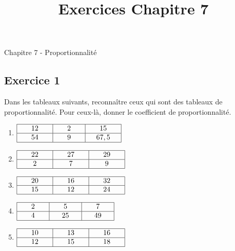 \documentclass[12 pt]{extarticle}
\title{Exercices Chapitre 7}
\date{}
\theoremstyle{plain}
\begin{document}
\begin{center}{\Large Chapitre 7 - Proportionnalité}\\
 \end{center} 

\subsection*{Exercice 1}

Dans les tableaux suivants, reconnaître ceux qui sont des tableaux de proportionnalité. Pour ceux-là, donner le coefficient de proportionnalité. 

\begin{enumerate}
\item $
\begin{array}{|c|c|c|}
\hline
\phantom{000}    12    \phantom{000} 
& \phantom{000}    2   \phantom{000} & 
\phantom{000}
15
\phantom{000}\\
\hline

54 & 9  & 67,5\\
\hline
\end{array}$

\item $
\begin{array}{|c|c|c|}
\hline
\phantom{000}    22   \phantom{000} 
& \phantom{000}   27    \phantom{000} & 
\phantom{000}29
\phantom{000}\\
\hline
2 &7  & 9\\
\hline
\end{array}$

\item $
\begin{array}{|c|c|c|}
\hline
\phantom{000}    20    \phantom{000} 
& \phantom{000}     16  \phantom{000} & 
\phantom{000}
32
\phantom{000}\\
\hline

 15 & 12 & 24 \\
\hline
\end{array}$

\item $
\begin{array}{|c|c|c|}
\hline
\phantom{000}    2    \phantom{000} 
& \phantom{000}     5  \phantom{000} & 
\phantom{000}
7
\phantom{000}\\
\hline

4 & 25 & 49 \\
\hline
\end{array}$

\item $
\begin{array}{|c|c|c|}
\hline
\phantom{000}    10    \phantom{000} 
& \phantom{000}   13    \phantom{000} & 
\phantom{000}16
\phantom{000}\\
\hline
12 &15  & 18\\
\hline
\end{array}$


\end{enumerate}
\end{document}
